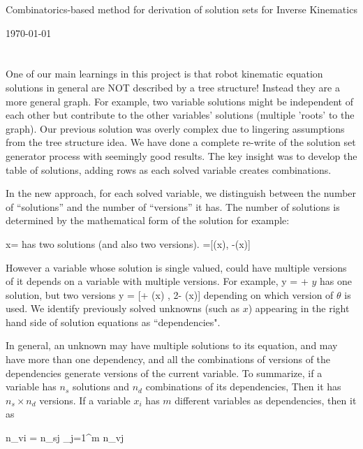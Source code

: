 \documentclass[letterpaper]{article}
\begin{document}
\begin{center}\Large{Combinatorics-based method for derivation of solution sets for
Inverse Kinematics}

\today
\end{center}

\section{}
One of our main learnings in this project is that robot kinematic equation solutions in general are NOT described by a tree structure! Instead they are a more general graph. For example, two variable solutions might be independent of each other but contribute to the other variables' solutions (multiple 'roots' to the graph). Our previous solution was overly complex due to lingering assumptions from the tree structure idea.
We have done a complete re-write of the solution set generator process with seemingly good results. The key insight was to develop the table of solutions, adding rows as each solved variable creates combinations.

In the new approach, for each solved variable, we distinguish between the number of ``solutions” and the number of
``versions” it has.  The number of solutions is determined by the mathematical form of the
solution for example:

\beq
x=\sin{(\theta)}
\eeq
\noindent
has two solutions (and also two versions).
\beq
\theta =[\arcsin(x), \pi-\arcsin(x)]
\eeq

However a variable whose solution is single valued, could have multiple versions of it depends on a variable with multiple versions.  For example,
\beq
y = \theta + \pi
\eeq
\noindent
$y$ has one solution, but two versions
\beq
y = [\pi + \arcsin(x) , 2\pi - \arcsin(x)]
\eeq
depending on which version of $ \theta$ is used.  We identify previously solved unknowns (such as $x$)
appearing in
the right hand side of solution equations as ``dependencies".

In general, an unknown may have multiple solutions to its equation, and may have more than one dependency,
and all the combinations of versions of the dependencies
generate  versions of the current variable.
To summarize, if a variable has $n_s$ solutions and $n_d$  combinations of its dependencies,
Then it has $n_s \times n_d$ versions.  If a variable $x_i$ has $m$ different variables as dependencies, then
it as

\beq\label{VersionProductEqn}
n_{vi} = n_{sj} \Pi_{j=1}^{m} n_{vj}
\eeq
\end{document}

